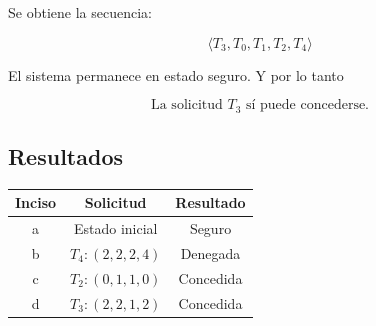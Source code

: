 \documentclass[12pt,letterpaper]{article}
\begin{document}
Se obtiene la secuencia:

\[
\langle T_3, T_0, T_1, T_2, T_4 \rangle
\]

El sistema permanece en estado seguro. Y por lo tanto

\[
\boxed{\text{La solicitud $T_3$ sí puede concederse.}}
\]

\subsection*{Resultados}

\begin{center}
  \begin{tabular}{c|c|c}
    Inciso & Solicitud & Resultado \\
    \hline
    a & Estado inicial & Seguro \\
    b & $T_4:(2,2,2,4)$ & Denegada \\
    c & $T_2:(0,1,1,0)$ & Concedida \\
    d & $T_3:(2,2,1,2)$ & Concedida
  \end{tabular}
\end{center}
\end{document}
